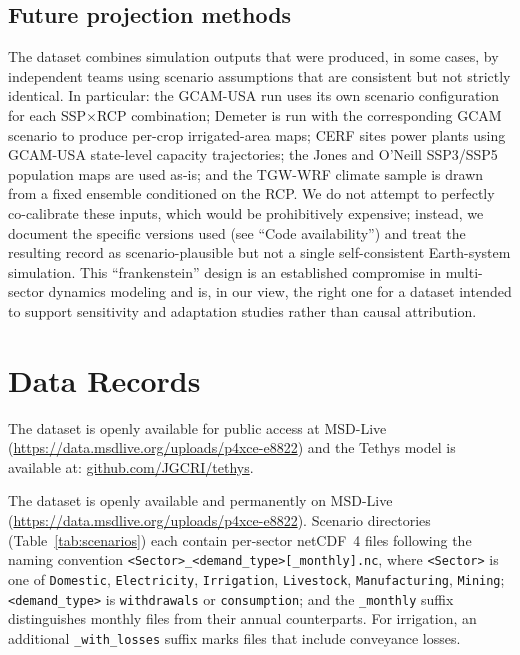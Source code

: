 \documentclass[fleqn,10pt]{wlscirep}
\begin{document}
\subsection*{Future projection methods}

The dataset combines simulation outputs that were produced, in some cases, by independent teams using scenario assumptions that are consistent but not strictly identical. In particular: the GCAM-USA run uses its own scenario configuration for each SSP$\times$RCP combination; Demeter is run with the corresponding GCAM scenario to produce per-crop irrigated-area maps; CERF sites power plants using GCAM-USA state-level capacity trajectories; the Jones and O'Neill SSP3/SSP5 population maps are used as-is; and the TGW-WRF climate sample is drawn from a fixed ensemble conditioned on the RCP. We do not attempt to perfectly co-calibrate these inputs, which would be prohibitively expensive; instead, we document the specific versions used (see ``Code availability'') and treat the resulting record as scenario-plausible but not a single self-consistent Earth-system simulation. This ``frankenstein'' design is an established compromise in multi-sector dynamics modeling\cite{Khan2023} and is, in our view, the right one for a dataset intended to support sensitivity and adaptation studies rather than causal attribution.

\section*{Data Records}

The dataset is openly available for public access at MSD-Live (\url{https://data.msdlive.org/uploads/p4xce-e8822}) and the Tethys model is available at: \href{https://github.com/JGCRI/tethys}{github.com/JGCRI/tethys}.

The dataset is openly available and  permanently on MSD-Live (\url{https://data.msdlive.org/uploads/p4xce-e8822}). Scenario directories (Table~\ref{tab:scenarios}) each contain per-sector netCDF~4 files following the naming convention
\texttt{<Sector>\_<demand\_type>[\_monthly].nc}, where \texttt{<Sector>} is one of \texttt{Domestic}, \texttt{Electricity}, \texttt{Irrigation}, \texttt{Livestock}, \texttt{Manufacturing}, \texttt{Mining}; \texttt{<demand\_type>} is \texttt{withdrawals} or \texttt{consumption}; and the \texttt{\_monthly} suffix distinguishes monthly files from their annual counterparts. For irrigation, an additional \texttt{\_with\_losses} suffix marks files that include conveyance losses.
\end{document}
